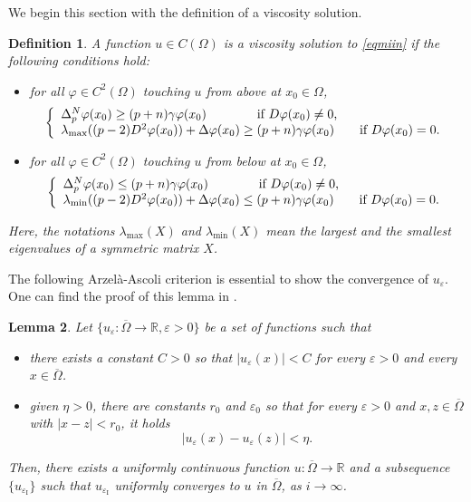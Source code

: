 \documentclass[english]{amsart}
\newcommand{\eps}{\varepsilon}
\theoremstyle{plain}
\newtheorem{definition}{Definition}[section]
\newtheorem{lemma}[definition]{Lemma}
\theoremstyle{definition}
\theoremstyle{remark}
\numberwithin{equation}{section}
\begin{document}
We begin this section with the definition of a viscosity solution.
\begin{definition} \label{vissol} 
A function $u \in C(\Omega) $ is a viscosity solution to \eqref{eqmiin} if
the following conditions hold:
\begin{itemize}
\item[(a)] for all $ \varphi \in C^{2}(\Omega ) $ touching $u$ from above at $x_{0} \in \Omega $, 
\begin{align*} 
\left\{ \begin{array}{ll}
 \Delta_{p}^{N}\varphi(x_{0})  \ge (p+n)\gamma \varphi(x_{0}) \qquad \qquad \textrm{if $ D\varphi (x_{0}) \neq 0 $,}\\
\lambda_{\max}((p-2)D^{2}\varphi(x_{0}) )  + \Delta\varphi(x_{0}) \ge (p+n)\gamma \varphi(x_{0})  \qquad \textrm{if $D\varphi (x_{0}) = 0   $.}\\
\end{array} \right. 
\end{align*}
\item[(b)] for all $ \varphi \in C^{2}(\Omega ) $ touching $u$ from below at $x_{0} \in \Omega $, 
\begin{align*} 
\left\{ \begin{array}{ll}
 \Delta_{p}^{N}\varphi(x_{0})  \le (p+n)\gamma \varphi(x_{0}) \qquad \qquad \textrm{if $ D\varphi (x_{0}) \neq 0 $,}\\
\lambda_{\min}((p-2)D^{2}\varphi(x_{0}) )  + \Delta\varphi(x_{0}) \le (p+n)\gamma \varphi(x_{0})  \qquad \textrm{if $D\varphi (x_{0}) = 0   $.}\\
\end{array} \right. 
\end{align*}
\end{itemize}
Here, the notations $\lambda_{\max}(X)$ and $\lambda_{\min}(X)$ mean the largest and the smallest eigenvalues of a symmetric matrix $X$. 
\end{definition}


The following Arzel\`{a}-Ascoli criterion is essential to show the convergence of $u_{\eps}$.
One can find the proof of this lemma in \cite[Lemma 4.2]{MR3011990}.
\begin{lemma} \label{aras}
Let $ \{ u_{\eps} : \overline{\Omega} \to \mathbb{R}, \eps>0 \} $ be a set of functions such that
\begin{itemize}
\item[(a)] there exists a constant $C >0$ so that $|u_{\eps}(x)| < C $ for every $ \eps > 0$ and every $x \in \overline{\Omega} $. 
\\ \item[(b)] given $ \eta > 0$, there are constants $r_{0}$ and $\eps_{0}$ so that for every $\eps >0$ and $x,z \in \overline{\Omega}$ with $|x-z| < r_{0} $, it holds
$$ |u_{\eps}(x)-u_{\eps}(z)| < \eta .$$
\end{itemize}
Then, there exists a uniformly continuous function $u: \overline{\Omega} \to \mathbb{R} $ and a subsequence $\{ u_{\eps_{\textrm{I}}} \} $ such that $ u_{\eps_{\textrm{I}}}  $ uniformly converges to $u$  in $\overline{\Omega}$, as $i \to \infty$.
\end{lemma}
\end{document}
